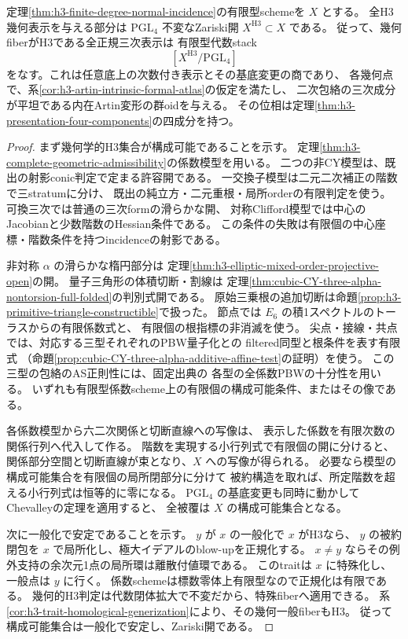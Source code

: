 \begin{theorem}\label{thm:h3-presentation-algebraic-open}
定理\ref{thm:h3-finite-degree-normal-incidence}の有限型schemeを $X$ とする。
全H3幾何表示を与える部分は $\mathrm{PGL}_4$ 不変なZariski開
$X^{\mathrm{H3}}\subset X$ である。
従って、幾何fiberがH3である全正規三次表示は
有限型代数stack
\[
 [X^{\mathrm{H3}}/\mathrm{PGL}_4]
\]
をなす。これは任意底上の次数付き表示とその基底変更の商であり、
各幾何点で、系\ref{cor:h3-artin-intrinsic-formal-atlas}の仮定を満たし、
二次包絡の三次成分が平坦である内在Artin変形の群oidを与える。
その位相は定理\ref{thm:h3-presentation-four-components}の四成分を持つ。
\end{theorem}
\begin{proof}
まず幾何学的H3集合が構成可能であることを示す。
定理\ref{thm:h3-complete-geometric-admissibility}の係数模型を用いる。
二つの非CY模型は、既出の射影conic判定で定まる許容開である。
一交換子模型は二元二次補正の階数で三stratumに分け、
既出の純立方・二元重根・局所orderの有限判定を使う。
可換三次では普通の三次formの滑らかな開、
対称Clifford模型では中心のJacobianと少数階数のHessian条件である。
この条件の失敗は有限個の中心座標・階数条件を持つincidenceの射影である。

非対称 $\alpha$ の滑らかな楕円部分は
定理\ref{thm:h3-elliptic-mixed-order-projective-open}の開。
量子三角形の体積切断・割線は
定理\ref{thm:cubic-CY-three-alpha-nontorsion-full-folded}の判別式開である。
原始三乗根の追加切断は命題\ref{prop:h3-primitive-triangle-constructible}で扱った。
節点では $E_6$ の積1スペクトルのトーラスからの有限係数式と、
有限個の根指標の非消滅を使う。
尖点・接線・共点では、対応する三型それぞれのPBW量子化との
filtered同型と根条件を表す有限式
（命題\ref{prop:cubic-CY-three-alpha-additive-affine-test}の証明）を使う。
この三型の包絡のAS正則性には、固定出典\cite{AS4CYpinned}の
各型の全係数PBWの十分性を用いる。
いずれも有限型係数scheme上の有限個の構成可能条件、またはその像である。

各係数模型から六二次関係と切断直線への写像は、
表示した係数を有限次数の関係行列へ代入して作る。
階数を実現する小行列式で有限個の開に分けると、
関係部分空間と切断直線が束となり、$X$ への写像が得られる。
必要なら模型の構成可能集合を有限個の局所閉部分に分けて
被約構造を取れば、所定階数を超える小行列式は恒等的に零になる。
$\mathrm{PGL}_4$ の基底変更も同時に動かしてChevalleyの定理を適用すると、
全被覆は $X$ の構成可能集合となる。

次に一般化で安定であることを示す。
$y$ が $x$ の一般化で $x$ がH3なら、
$y$ の被約閉包を $x$ で局所化し、極大イデアルのblow-upを正規化する。
$x\ne y$ ならその例外支持の余次元1点の局所環は離散付値環である。
このtraitは $x$ に特殊化し、一般点は $y$ に行く。
係数schemeは標数零体上有限型なので正規化は有限である。
幾何的H3判定は代数閉体拡大で不変だから、特殊fiberへ適用できる。
系\ref{cor:h3-trait-homological-generization}により、その幾何一般fiberもH3。
従って構成可能集合は一般化で安定し、Zariski開である。


\end{proof}
